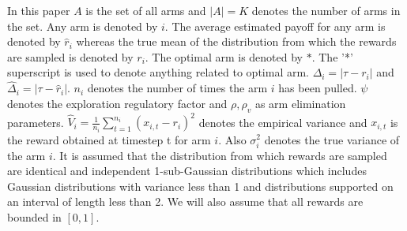 In this paper $A$ is the set of all arms and $|A|=K$ denotes the number of arms in the set. Any arm is denoted by $i$. The average estimated payoff for any arm is denoted by $\hat{r}_{i}$ whereas the true mean of the distribution from which the rewards are sampled is denoted by $r_{i}$. The optimal arm is denoted by $*$. The '*' superscript is used to denote anything related to optimal arm.  $\Delta_{i}=|\tau-r_{i}|$ and $\hat{\Delta}_{i}=|\tau-\hat{r}_{i}|$.  $n_{i}$ denotes the number of times the arm $i$ has been pulled. $\psi $ denotes the exploration regulatory factor and $\rho,\rho_v$ as arm elimination parameters. $\hat{V}_{i}=\frac{1}{n_i}\sum_{t=1}^{n_{i}}(x_{i,t}-r_{i})^{2}$ denotes the empirical variance and $x_{i,t}$ is the reward obtained at timestep t for arm $i$. Also  $\sigma_{i}^{2}$ denotes the true variance of the arm $i$. It is assumed that the distribution from which rewards are sampled are identical and independent 1-sub-Gaussian distributions which includes Gaussian distributions with variance less than 1 and distributions supported on an interval of length less than 2. We will also assume that all rewards are bounded in $[0,1]$.


